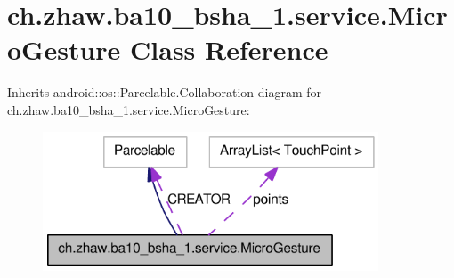 \hypertarget{classch_1_1zhaw_1_1ba10__bsha__1_1_1service_1_1MicroGesture}{
\section{ch.zhaw.ba10\_\-bsha\_\-1.service.MicroGesture Class Reference}
\label{classch_1_1zhaw_1_1ba10__bsha__1_1_1service_1_1MicroGesture}
}


Inherits android::os::Parcelable.Collaboration diagram for ch.zhaw.ba10\_\-bsha\_\-1.service.MicroGesture:\nopagebreak
\begin{figure}[H]
\begin{center}
\leavevmode
\includegraphics[width=283pt]{classch_1_1zhaw_1_1ba10__bsha__1_1_1service_1_1MicroGesture__coll__graph}
\end{center}
\end{figure}
